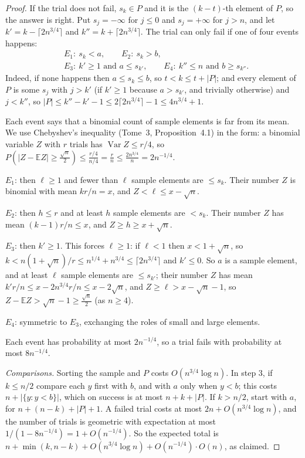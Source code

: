 \begin{proof}
If the trial does not fail, $s_k\in P$ and it is the $(k-t)$-th element of $P$, so the answer is right. Put $s_j=-\infty$ for $j\le0$ and $s_j=+\infty$ for $j>n$, and let
$k'=k-\lceil2n^{3/4}\rceil$ and $k''=k+\lceil2n^{3/4}\rceil$. The trial can only fail if one of four events happens:
\[
\begin{aligned}
&E_1:\ s_k<a,\qquad E_2:\ s_k>b,\\
&E_3:\ k'\ge1\text{ and }a\le s_{k'},\qquad E_4:\ k''\le n\text{ and }b\ge s_{k''}.
\end{aligned}
\]
Indeed, if none happens then $a\le s_k\le b$, so $t<k\le t+|P|$; and every element of $P$ is some $s_j$ with $j>k'$ (if $k'\ge1$ because $a>s_{k'}$, and trivially otherwise) and
$j<k''$, so $|P|\le k''-k'-1\le2\lceil2n^{3/4}\rceil-1\le4n^{3/4}+1$.

Each event says that a binomial count of sample elements is far from its mean. We use Chebyshev's inequality (Tome~3, Proposition~4.1) in the form: a binomial
variable $Z$ with $r$ trials has $\operatorname{Var}Z\le r/4$, so $P(|Z-\mathbb EZ|\ge\frac{\sqrt n}2)\le\frac{r/4}{n/4}=\frac rn\le\frac{2n^{3/4}}n=2n^{-1/4}$.

$E_1$: then $\ell\ge1$ and fewer than $\ell$ sample elements are $\le s_k$. Their number $Z$ is binomial with mean $kr/n=x$, and $Z<\ell\le x-\sqrt n$.

$E_2$: then $h\le r$ and at least $h$ sample elements are $<s_k$. Their number $Z$ has mean $(k-1)r/n\le x$, and $Z\ge h\ge x+\sqrt n$.

$E_3$: then $k'\ge1$. This forces $\ell\ge1$: if $\ell<1$ then $x<1+\sqrt n$, so $k<n(1+\sqrt n)/r\le n^{1/4}+n^{3/4}\le\lceil2n^{3/4}\rceil$ and $k'\le0$. So $a$ is a sample element, and at
least $\ell$ sample elements are $\le s_{k'}$; their number $Z$ has mean $k'r/n\le x-2n^{3/4}r/n\le x-2\sqrt n$, and $Z\ge\ell>x-\sqrt n-1$, so $Z-\mathbb EZ>\sqrt n-1\ge\frac{\sqrt n}2$
(as $n\ge4$).

$E_4$: symmetric to $E_3$, exchanging the roles of small and large elements.

Each event has probability at most $2n^{-1/4}$, so a trial fails with probability at most $8n^{-1/4}$.

\emph{Comparisons.} Sorting the sample and $P$ costs $O(n^{3/4}\log n)$. In step 3, if $k\le n/2$ compare each $y$ first with $b$, and with $a$ only when $y<b$; this
costs $n+|\{y:y<b\}|$, which on success is at most $n+k+|P|$. If $k>n/2$, start with $a$, for $n+(n-k)+|P|+1$. A failed trial costs at most $2n+O(n^{3/4}\log n)$, and the
number of trials is geometric with expectation at most $1/(1-8n^{-1/4})=1+O(n^{-1/4})$. So the expected total is $n+\min(k,n-k)+O(n^{3/4}\log n)+O(n^{-1/4})\cdot O(n)$, as claimed.
\end{proof}

